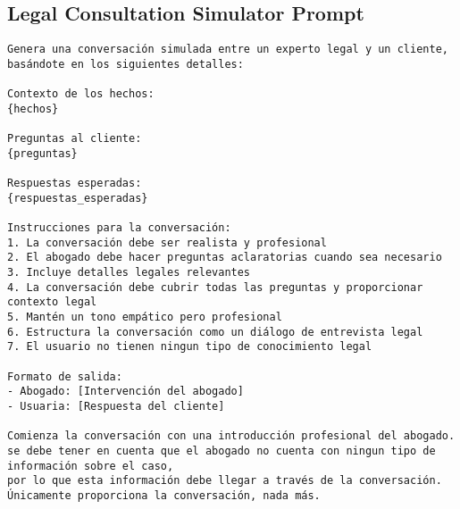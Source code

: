 \subsection{Legal Consultation Simulator Prompt}
\label{subsec:legal-consult-prompt}
\begin{lstlisting}[style=prompt]
Genera una conversación simulada entre un experto legal y un cliente, basándote en los siguientes detalles:

Contexto de los hechos:
{hechos}

Preguntas al cliente:
{preguntas}

Respuestas esperadas:
{respuestas_esperadas}

Instrucciones para la conversación:
1. La conversación debe ser realista y profesional
2. El abogado debe hacer preguntas aclaratorias cuando sea necesario
3. Incluye detalles legales relevantes
4. La conversación debe cubrir todas las preguntas y proporcionar contexto legal
5. Mantén un tono empático pero profesional
6. Estructura la conversación como un diálogo de entrevista legal
7. El usuario no tienen ningun tipo de conocimiento legal

Formato de salida:
- Abogado: [Intervención del abogado]
- Usuaria: [Respuesta del cliente]

Comienza la conversación con una introducción profesional del abogado. se debe tener en cuenta que el abogado no cuenta con ningun tipo de información sobre el caso, 
por lo que esta información debe llegar a través de la conversación.
Únicamente proporciona la conversación, nada más.
\end{lstlisting}

\endinput

